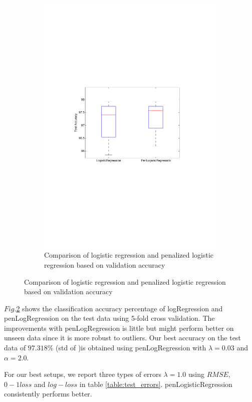 \begin{figure}[h]
\begin{subfigure}[b]{0.45\textwidth}
    \includegraphics[clip, trim=4cm 10cm 3cm 10cm, width=\textwidth]{figures/comparison_LR_pLR.pdf}
    \caption{Comparison of logistic regression and penalized logistic regression based on validation accuracy}
    \label{fig:comp_LR_pLR}
  \end{subfigure}
\end{figure}


$Fig.$\ref{fig:comp_LR_pLR} shows the classification accuracy percentage  of logRegression and penLogRegression on the test data using 5-fold cross validation. The improvements with penLogRegression is little but might perform better on unseen data since it is more robust to outliers. Our best accuracy on the test data of $97.318\%$  (std of )is obtained using penLogRegression with $\lambda=0.03$ and $\alpha=2.0$. 

For our best setups, we report three types of errors $\lambda=1.0$ using $RMSE$, $0-1 loss$ and $log-loss$  in table \ref{table:test_errors}. penLogisticRegression consistently performs better.


